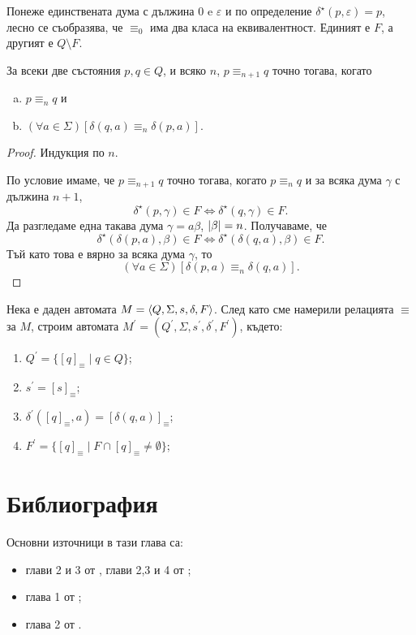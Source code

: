 Понеже единствената дума с дължина $0$ e $\varepsilon$ и по определение $\delta^\star(p,\varepsilon) = p$, 
лесно се съобразява, че $\equiv_0$ има два класа на еквивалентност.
Единият е $F$, а другият е $Q\setminus F$.

\begin{prop}
  За всеки две състояния $p,q \in Q$, и всяко $n$, $p \equiv_{n+1} q$ точно тогава, когато
  \begin{enumerate}[a)]
  \item
    $p \equiv_{n} q$ и
  \item
    $(\forall a \in \Sigma)[\delta(q,a) \equiv_{n} \delta(p,a)]$.
  \end{enumerate}
\end{prop}
\begin{proof}%
  Индукция по $n$.
  
  По условие имаме, че $p\equiv_{n+1} q$ точно тогава, когато
  $p\equiv_n q$ и за всяка дума $\gamma$ с дължина $n+1$,
  \[\delta^\star(p,\gamma) \in F \iff \delta^\star(q,\gamma)\in F.\]
  Да разгледаме една такава дума $\gamma = a\beta$, $\lvert{\beta}\rvert = n$.
  Получаваме, че 
  \[\delta^\star(\delta(p,a),\beta) \in F \iff \delta^\star(\delta(q,a),\beta) \in F.\]
  Тъй като това е вярно за всяка дума $\gamma$, то
  \[(\forall a\in\Sigma)[\delta(p,a) \equiv_{n} \delta(q, a)].\]
  
\end{proof}

Нека е даден автомата $M = \langle{Q,\Sigma,s,\delta,F}\rangle$.
След като сме намерили релацията $\equiv$ за $M$, 
строим автомата $M^\prime = (Q^\prime,\Sigma,s^\prime,\delta^\prime,F^\prime)$, където:
\begin{enumerate}[1)]
\item
  $Q^\prime = \{[q]_\equiv \mid q\in Q\}$;
\item
  $s^\prime = [s]_\equiv$;
\item
  $\delta^\prime([q]_\equiv, a) = [\delta(q,a)]_\equiv$;
\item
  $F^\prime = \{[q]_\equiv\mid F\cap [q]_\equiv \neq \emptyset\}$;
\end{enumerate}


\section*{Библиография}

Основни източници в тази глава са:
\begin{itemize}
\item 
  глави 2 и 3 от \cite{hopcroft1}, глави 2,3 и 4 от \cite{hopcroft2};
\item
  глава 1 от \cite{sipser1};
\item
  глава 2 от \cite{papadimitriou}.
\end{itemize}



